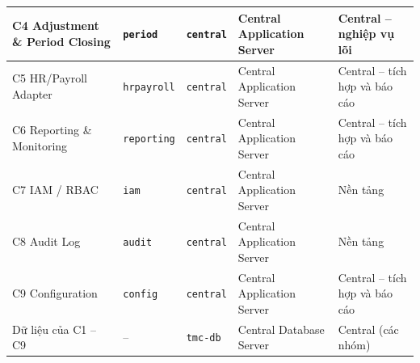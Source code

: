 \begin{longtable}{|>{\raggedright\arraybackslash}p{4.1cm}|>{\raggedright\arraybackslash}p{2.4cm}|>{\raggedright\arraybackslash}p{2.3cm}|>{\raggedright\arraybackslash}p{3.0cm}|>{\raggedright\arraybackslash}p{3.0cm}|}
\hline
C4 Adjustment \& Period Closing & \texttt{period} & \texttt{central} & Central Application Server & Central -- nghiệp vụ lõi \\
\hline
C5 HR/Payroll Adapter & \texttt{hrpayroll} & \texttt{central} & Central Application Server & Central -- tích hợp và báo cáo \\
\hline
C6 Reporting \& Monitoring & \texttt{reporting} & \texttt{central} & Central Application Server & Central -- tích hợp và báo cáo \\
\hline
C7 IAM / RBAC & \texttt{iam} & \texttt{central} & Central Application Server & Nền tảng \\
\hline
C8 Audit Log & \texttt{audit} & \texttt{central} & Central Application Server & Nền tảng \\
\hline
C9 Configuration & \texttt{config} & \texttt{central} & Central Application Server & Central -- tích hợp và báo cáo \\
\hline
Dữ liệu của C1 -- C9 & -- & \texttt{tmc-db} & Central Database Server & Central (các nhóm) \\
\hline
\end{longtable}
\endgroup
